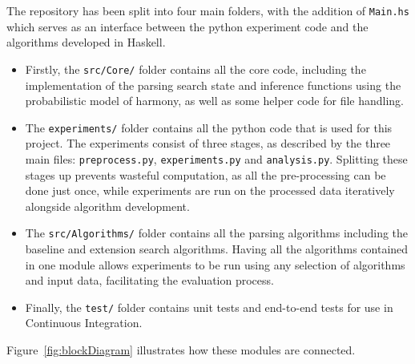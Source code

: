 \documentclass[12pt,a4paper,twoside,openright]{report}
\theoremstyle{definition}
\begin{document}
The repository has been split into four main folders, with the addition of \texttt{Main.hs} which serves as an interface between the python experiment code and the algorithms developed in Haskell. 
\begin{itemize}
  \item Firstly, the \texttt{src/Core/} folder contains all the core code, including the implementation of the parsing search state and inference functions using the probabilistic model of harmony, as well as some helper code for file handling. 
  \item The \texttt{experiments/} folder contains all the python code that is used for this project. The experiments consist of three stages, as described by the three main files: \texttt{preprocess.py}, \texttt{experiments.py} and \texttt{analysis.py}. Splitting these stages up prevents wasteful computation, as all the pre-processing can be done just once, while experiments are run on the processed data iteratively alongside algorithm development. 
  \item The \texttt{src/Algorithms/} folder contains all the parsing algorithms including the baseline and extension search algorithms. Having all the algorithms contained in one module allows experiments to be run using any selection of algorithms and input data, facilitating the evaluation process.  
  \item Finally, the \texttt{test/} folder contains unit tests and end-to-end tests for use in Continuous Integration.
\end{itemize}

Figure~\ref{fig:blockDiagram} illustrates how these modules are connected. 
\end{document}
